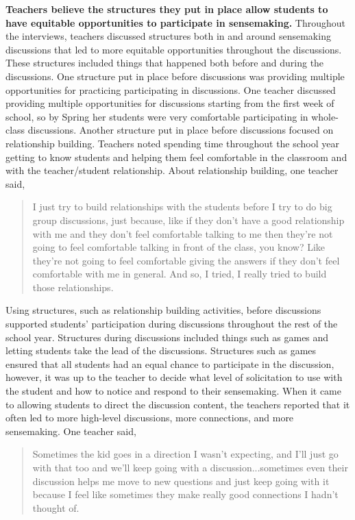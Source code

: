 \documentclass{sig-alternate} %
\begin{document}
\begin{large}
\textbf{Teachers believe the structures they put in place allow students to have equitable opportunities to participate in sensemaking.} Throughout the interviews, teachers discussed structures both in and around sensemaking discussions that led to more equitable opportunities throughout the discussions. These structures included things that happened both before and during the discussions. One structure put in place before discussions was providing multiple opportunities for practicing participating in discussions. One teacher discussed providing multiple opportunities for discussions starting from the first week of school, so by Spring her students were very comfortable participating in whole-class discussions. Another structure put in place before discussions focused on relationship building. Teachers noted spending time throughout the school year getting to know students and helping them feel comfortable in the classroom and with the teacher/student relationship. About relationship building, one teacher said, 

\begin{quote}
I just try to build relationships with the students before I try to do big group discussions, just because, like if they don't have a good relationship with me and they don't feel comfortable talking to me then they're not going to feel comfortable talking in front of the class, you know? Like they're not going to feel comfortable giving the answers if they don't feel comfortable with me in general. 	 And so, I tried, I really tried to build those relationships. 
\end{quote}

Using structures, such as relationship building activities, before discussions supported students’ participation during discussions throughout the rest of the school year. Structures during discussions included things such as games and letting students take the lead of the discussions. Structures such as games ensured that all students had an equal chance to participate in the discussion, however, it was up to the teacher to decide what level of solicitation to use with the student and how to notice and respond to their sensemaking. When it came to allowing students to direct the discussion content, the teachers reported that it often led to more high-level discussions, more connections, and more sensemaking. One teacher said, 
\\
\begin{quote}
Sometimes the kid goes in a direction I wasn't expecting, and I'll just go with that too and we'll keep going with a discussion...sometimes even their discussion helps 	me move to new questions and just keep going with it because I feel like 			sometimes they make really good connections I hadn't thought of. 
\end{quote}


\end{large}
\end{document}
